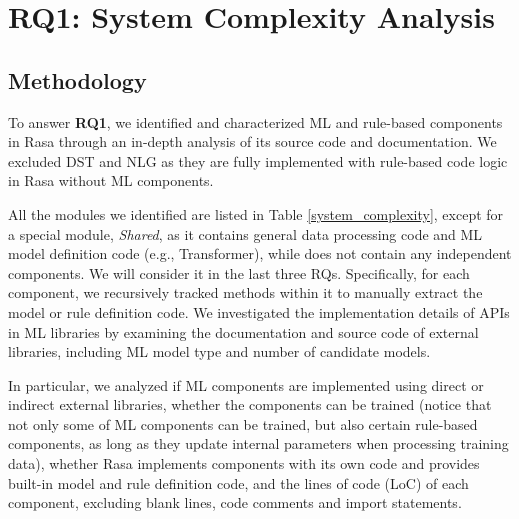 
\section{RQ1: System Complexity Analysis}
\vspace{-3pt}

\subsection{Methodology}

To answer \textbf{RQ1}, we identified and characterized ML and rule-based components in Rasa through an in-depth analysis of its source code and documentation. We excluded DST and NLG as they are fully implemented with rule-based code logic in Rasa without ML components. 

All the modules we identified are listed in Table \ref{system_complexity}, except for a special module, \textit{Shared}, as it contains general data processing code and  ML model definition code (e.g., Transformer), while does not contain any independent components. We will consider it in the last three RQs. Specifically, for each component, we recursively tracked methods within it to manually extract the model or rule definition code. We investigated the implementation details of APIs in ML libraries by examining the documentation and source code of external libraries, including ML model type and number of candidate models. 

In particular, we analyzed if ML components are implemented using direct or indirect external libraries, whether the components can be trained (notice that not only some of ML components can be trained, but also certain rule-based components, as long as they update internal parameters when processing training data),  whether Rasa implements components with its own code and provides built-in model and rule definition code, and the lines of code (LoC) of each component, excluding blank lines, code comments and import statements. 




